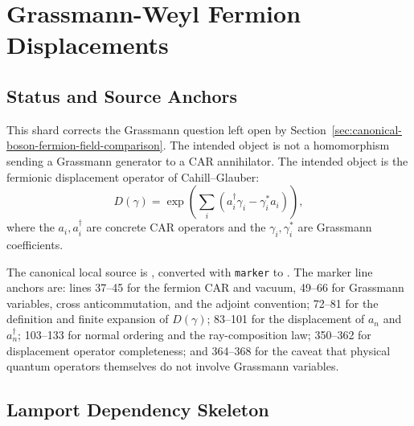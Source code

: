 
\section{Grassmann-Weyl Fermion Displacements}
\label{sec:grassmann-weyl-fermion-displacements}

\subsection{Status and Source Anchors}

This shard corrects the Grassmann question left open by
Section~\ref{sec:canonical-boson-fermion-field-comparison}.  The intended
object is not a homomorphism sending a Grassmann generator to a CAR
annihilator.  The intended object is the fermionic displacement operator of
Cahill--Glauber:
\[
  D(\gamma)=
  \exp\!\left(\sum_i(a_i^\dagger\gamma_i-\gamma_i^*a_i)\right),
\]
where the \(a_i,a_i^\dagger\) are concrete CAR operators and the
\(\gamma_i,\gamma_i^*\) are Grassmann coefficients.

The canonical local source is
, converted with
\texttt{marker} to
.
The marker line anchors are: lines 37--45 for the fermion CAR and vacuum,
49--66 for Grassmann variables, cross anticommutation, and the adjoint
convention; 72--81 for the definition and finite expansion of \(D(\gamma)\);
83--101 for the displacement of \(a_n\) and \(a_n^\dagger\); 103--133 for
normal ordering and the ray-composition law; 350--362 for displacement
operator completeness; and 364--368 for the caveat that physical quantum
operators themselves do not involve Grassmann variables.

\subsection{Lamport Dependency Skeleton}

